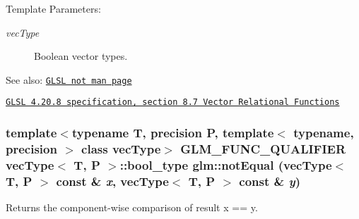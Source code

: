 \begin{Desc}
\item[Template Parameters:]
\begin{description}
\item[{\em vecType}]Boolean vector types.\end{description}
\end{Desc}
\begin{Desc}
\item[See also:]\href{http://www.opengl.org/sdk/docs/manglsl/xhtml/not.xml}{\tt GLSL not man page} 

\href{http://www.opengl.org/registry/doc/GLSLangSpec.4.20.8.pdf}{\tt GLSL 4.20.8 specification, section 8.7 Vector Relational Functions} \end{Desc}
\hypertarget{group__core__func__vector__relational_g520b77f15b84fffa9131cfa39db6c766}{
\subsubsection[notEqual]{\setlength{\rightskip}{0pt plus 5cm}template$<$typename T, precision P, template$<$ typename, precision $>$ class vecType$>$ GLM\_\-FUNC\_\-QUALIFIER vecType$<$ T, P $>$::bool\_\-type glm::notEqual (vecType$<$ T, P $>$ const \& {\em x}, \/  vecType$<$ T, P $>$ const \& {\em y})}}
\label{group__core__func__vector__relational_g520b77f15b84fffa9131cfa39db6c766}


Returns the component-wise comparison of result x == y.

